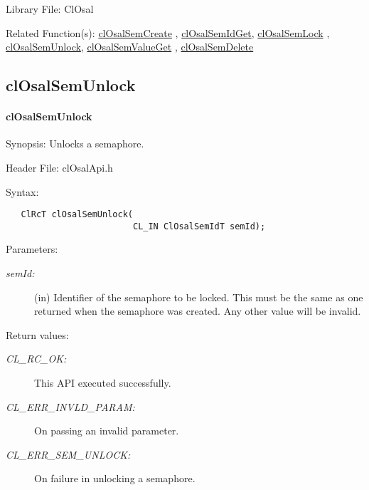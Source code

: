 \begin{Desc}
\item[Library File:]Cl\-Osal\end{Desc}
\begin{Desc}
\item[Related Function(s):]\hyperlink{pageosal132}{cl\-Osal\-Sem\-Create} , \hyperlink{pageosal133}{cl\-Osal\-Sem\-Id\-Get}, 
\hyperlink{pageosal134}{cl\-Osal\-Sem\-Lock} , \hyperlink{pageosal136}{cl\-Osal\-Sem\-Unlock}, 
\hyperlink{pageosal137}{cl\-Osal\-Sem\-Value\-Get} , \hyperlink{pageosal138}{cl\-Osal\-Sem\-Delete} \end{Desc}

\newpage
\subsection{clOsalSemUnlock}
\hypertarget{pageosal136}{}\paragraph{cl\-Osal\-Sem\-Unlock}\label{pageosal136}
\begin{Desc}
\item[Synopsis:]Unlocks a semaphore.\end{Desc}
\begin{Desc}
\item[Header File:]clOsalApi.h\end{Desc}
\begin{Desc}
\item[Syntax:]

\footnotesize\begin{verbatim}   ClRcT clOsalSemUnlock(
                         CL_IN ClOsalSemIdT semId);
\end{verbatim}
\normalsize
\end{Desc}
\begin{Desc}
\item[Parameters:]
\begin{description}
\item[{\em sem\-Id:}](in) Identifier of the semaphore to be locked. This must be the same as one returned when the semaphore was created. Any other value will be invalid.\end{description}
\end{Desc}
\begin{Desc}
\item[Return values:]
\begin{description}
\item[{\em CL\_\-RC\_\-OK:}]This API executed successfully. \item[{\em CL\_\-ERR\_\-INVLD\_\-PARAM:}]On passing an invalid parameter. \item[{\em CL\_\-ERR\_\-SEM\_\-UNLOCK:}]On failure in unlocking a semaphore.\end{description}
\end{Desc}

